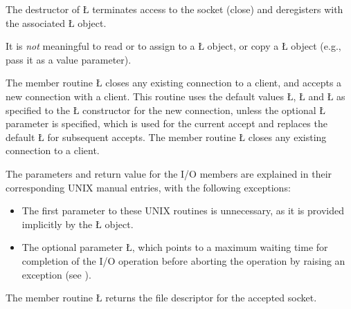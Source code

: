\documentclass[openright,twoside]{report}
\begin{document}
\begin{sloppypar}
The destructor of \LGinlinetrue\LGbegin\lgrinde\L{}\endlgrinde\LGend{} terminates access to the socket (close) and deregisters with the associated \LGinlinetrue\LGbegin\lgrinde\L{}\endlgrinde\LGend{} object.
\end{sloppypar}

It is \emph{not} meaningful to read or to assign to a \LGinlinetrue\LGbegin\lgrinde\L{}\endlgrinde\LGend{} object, or copy a \LGinlinetrue\LGbegin\lgrinde\L{}\endlgrinde\LGend{} object (e.g., pass it as a value parameter).

The member routine \LGinlinetrue\LGbegin\lgrinde\L{}\endlgrinde\LGend{} closes any existing connection to a client, and accepts a new connection with a client.
This routine uses the default values \LGinlinetrue\LGbegin\lgrinde\L{}\endlgrinde\LGend{}, \LGinlinetrue\LGbegin\lgrinde\L{}\endlgrinde\LGend{} and \LGinlinetrue\LGbegin\lgrinde\L{}\endlgrinde\LGend{} as specified to the \LGinlinetrue\LGbegin\lgrinde\L{}\endlgrinde\LGend{} constructor for the new connection, unless the optional \LGinlinetrue\LGbegin\lgrinde\L{}\endlgrinde\LGend{} parameter is specified, which is used for the current accept and replaces the default \LGinlinetrue\LGbegin\lgrinde\L{}\endlgrinde\LGend{} for subsequent accepts.
The member routine \LGinlinetrue\LGbegin\lgrinde\L{}\endlgrinde\LGend{} closes any existing connection to a client.

The parameters and return value for the I/O members are explained in their corresponding UNIX manual entries, with the following exceptions:
\begin{itemize}
\item
The first parameter to these UNIX routines is unnecessary, as it is provided implicitly by the \LGinlinetrue\LGbegin\lgrinde\L{}\endlgrinde\LGend{} object.
\item
The optional parameter \LGinlinetrue\LGbegin\lgrinde\L{}\endlgrinde\LGend{}, which points to a maximum waiting time for completion of the I/O operation before aborting the operation by raising an exception (see ).
\end{itemize}

The member routine \LGinlinetrue\LGbegin\lgrinde\L{}\endlgrinde\LGend{} returns the file descriptor for the accepted socket.
\end{document}
